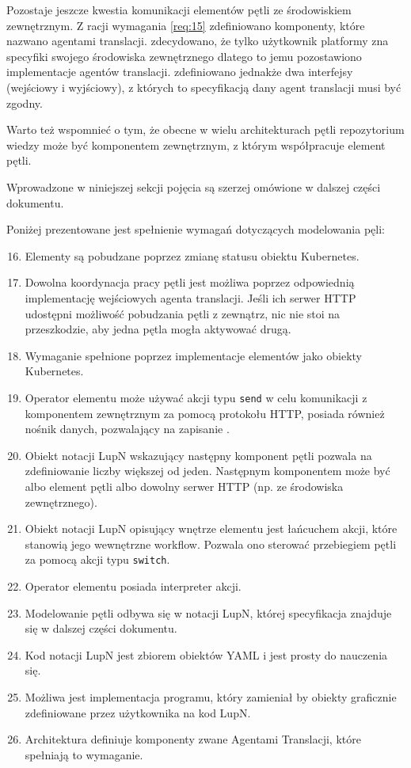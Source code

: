 Pozostaje jeszcze kwestia komunikacji elementów pętli ze środowiskiem zewnętrznym. Z racji wymagania \ref{req:15} zdefiniowano komponenty, które nazwano agentami translacji. zdecydowano, że tylko użytkownik platformy zna specyfiki swojego środowiska zewnętrznego dlatego to jemu pozostawiono implementacje agentów translacji. zdefiniowano jednakże dwa interfejsy (wejściowy i wyjściowy), z których to specyfikacją dany agent translacji musi być zgodny. 

Warto też wspomnieć o tym, że obecne w wielu architekturach pętli repozytorium wiedzy może być komponentem zewnętrznym, z którym współpracuje element pętli.

Wprowadzone w niniejszej sekcji pojęcia są szerzej omówione w dalszej części dokumentu. 

Poniżej prezentowane jest spełnienie wymagań dotyczących modelowania pęli:
\begin{enumerate}
    \setcounter{enumi}{15}
    \item Elementy są pobudzane poprzez zmianę statusu obiektu Kubernetes.
    \item Dowolna koordynacja pracy pętli jest możliwa poprzez odpowiednią implementację wejściowych agenta translacji. Jeśli ich serwer HTTP udostępni możliwość pobudzania pętli z zewnątrz, nic nie stoi na przeszkodzie, aby jedna pętla mogła aktywować drugą.
    \item Wymaganie spełnione poprzez implementacje elementów jako obiekty Kubernetes.
    \item Operator elementu może używać akcji typu \texttt{send} w celu komunikacji z komponentem zewnętrznym za pomocą protokołu HTTP, posiada również nośnik danych, pozwalający na zapisanie .
    \item Obiekt notacji LupN wskazujący następny komponent pętli pozwala na zdefiniowanie liczby większej od jeden. Następnym komponentem może być albo element pętli albo dowolny serwer HTTP (np. ze środowiska zewnętrznego).
    \item Obiekt notacji LupN opisujący wnętrze elementu jest łańcuchem akcji, które stanowią jego wewnętrzne workflow. Pozwala ono sterować przebiegiem pętli za pomocą akcji typu \texttt{switch}. 
    \item Operator elementu posiada interpreter akcji.
    \item Modelowanie pętli odbywa się w notacji LupN, której specyfikacja znajduje się w dalszej części dokumentu.
    \item Kod notacji LupN jest zbiorem obiektów YAML i jest prosty do nauczenia się.
    \item Możliwa jest implementacja programu, który zamieniał by obiekty graficznie zdefiniowane przez użytkownika na kod LupN.
    \item Architektura definiuje komponenty zwane Agentami Translacji, które spełniają to wymaganie.
\end{enumerate}
